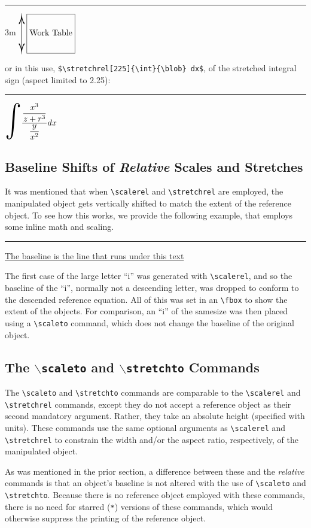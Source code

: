 \documentclass{article}
\newcommand\rl{\rule{2em}{0in}}
\let\vb\verb
\begin{document}
\rl3m $\stretchrel[500]{\updownarrow\,}
  {\fbox{\rule[-1.8em]{0ex}{4em}Work Table}}$

or in this use, \vb|$\stretchrel[225]{\int}{\blob} dx$|, of the
stretched integral sign (aspect limited to 2.25):

\rl$\stretchrel[225]{\int}{\blob} dx$


\subsection{Baseline Shifts of \textit{Relative} Scales and Stretches}

It was mentioned that when \vb|\scalerel| and \vb|\stretchrel| are
employed, the manipulated object gets vertically shifted to match the
extent of the reference object.  To see how this works, we provide the
following example, that employs some inline math and scaling.  

\rl\underline{The baseline is the line that runs under this text}
\underline{}

The first case of the large letter ``i'' was generated with 
\vb|\scalerel|, and so the baseline of the ``i'', normally not a
descending letter, was dropped to conform to the descended reference
equation.  All of this was set in an \vb|\fbox| to show the extent of
the objects.  For comparison, an ``i'' of the samesize was then placed
using a \vb|\scaleto| command, which does not change the baseline of
the original object.

\subsection{The $\backslash$\texttt{scaleto} and
$\backslash$\texttt{stretchto} Commands}

The \vb|\scaleto| and \vb|\stretchto| commands are comparable to the
\vb|\scalerel| and \vb|\stretchrel| commands, except they do not
accept a reference object as their second mandatory argument.  Rather,
they take an absolute height (specified with units).  These commands use
the same optional arguments as \vb|\scalerel| and \vb|\stretchrel|
to constrain the width and/or the aspect ratio, respectively, of the
manipulated object.

As was mentioned in the prior section, a difference between these and
the \textit{relative} commands is that an object's baseline is not
altered with the use of \vb|\scaleto| and \vb|\stretchto|.  Because
there is no reference object employed with these commands, there is no
need for starred (\vb|*|) versions of these commands, which would
otherwise suppress the printing of the reference object.
\end{document}
